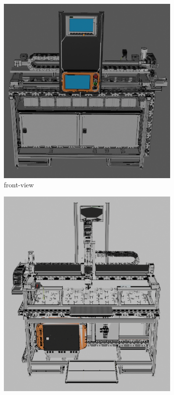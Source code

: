    \begin{figure}[h]
        \centering
        \begin{subfigure}{0.505\textwidth}
            \centering
            \includegraphics[width=\textwidth]{figures/unloading-station-front-blender.png} %
            \caption{front-view}
            \label{fig:unloading-station-front}
        \end{subfigure}\hfill
        \begin{subfigure}{0.45\textwidth}
            \centering
            \includegraphics[width=\textwidth]{figures/unloading-station-back-blender.png} %

\end{subfigure}
\end{figure}
